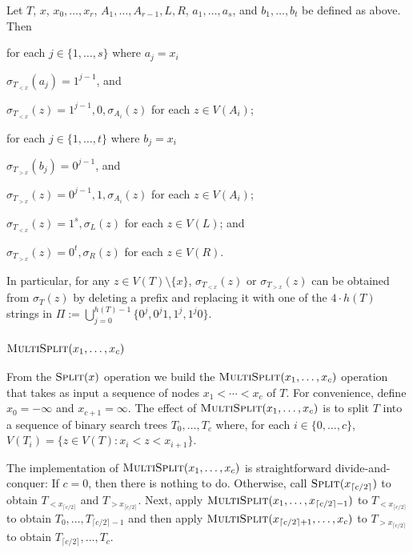 \documentclass[kpfonts]{patmorin}
\begin{document}
\begin{obs}
  Let $T$, $x$, $x_0,\ldots,x_r$, $A_1,\ldots,A_{r-1},L,R$, $a_1,\ldots,a_s$, and $b_1,\ldots,b_t$ be defined as above. Then
  \begin{compactenum}
    \item for each $j\in\{1,\ldots,s\}$ where $a_j=x_i$
    \begin{compactenum}
      \item $\sigma_{T_{<x}}(a_j)=1^{j-1}$, and 
      \item $\sigma_{T_{<x}}(z) = 1^{j-1},0,\sigma_{A_i}(z)$ for each $z\in V(A_i)$;
    \end{compactenum}
    \item for each $j\in\{1,\ldots,t\}$ where $b_j=x_i$
    \begin{compactenum}
      \item $\sigma_{T_{>x}}(b_j)=0^{j-1}$, and 
      \item $\sigma_{T_{>x}}(z) = 0^{j-1},1,\sigma_{A_i}(z)$ for each $z\in V(A_i)$;
    \end{compactenum}
    \item $\sigma_{T_{<x}}(z)=1^s,\sigma_L(z)$ for each $z\in V(L)$; and
    \item $\sigma_{T_{>x}}(z)=0^t,\sigma_R(z)$ for each $z\in V(R)$.
  \end{compactenum}
  In particular, for any $z\in V(T)\setminus\{x\}$, $\sigma_{T_{<x}}(z)$ or $\sigma_{T_{>x}}(z)$ can be obtained from $\sigma_T(z)$ by deleting a prefix and replacing it with one of the $4\cdot h(T)$ strings in $\Pi:=\bigcup_{j=0}^{h(T)-1}\{0^j,0^j1,1^j,1^j0\}$.
\end{obs}

\subsubsection{$\textsc{MultiSplit}(x_1,\ldots,x_c)$}

From the $\textsc{Split}(x)$ operation we build the $\textsc{MultiSplit}(x_1,\ldots,x_c)$ operation that takes as input a sequence of nodes $x_1<\cdots<x_c$ of $T$.  For convenience, define $x_0=-\infty$ and $x_{c+1}=\infty$.  The effect of $\textsc{MultiSplit}(x_1,\ldots,x_c)$ is to split $T$ into a sequence of binary search trees $T_0,\ldots,T_{c}$ where, for each $i\in\{0,\ldots,c\}$, $V(T_i)=\{z\in V(T): x_i< z<x_{i+1}\}$.

The implementation of $\textsc{MultiSplit}(x_1,\ldots,x_c)$ is straightforward divide-and-conquer:  If $c=0$, then there is nothing to do.  Otherwise, call $\textsc{Split}(x_{\lceil c/2\rceil})$ to obtain $T_{<x_{\lceil c/2\rceil}}$ and $T_{>x_{\lceil c/2\rceil}}$.  Next, apply $\textsc{MultiSplit}(x_1,\ldots,x_{\lceil c/2\rceil-1})$ to $T_{<x_{\lceil c/2\rceil}}$ to obtain $T_0,\ldots,T_{\lceil c/2\rceil-1}$ and then apply $\textsc{MultiSplit}(x_{\lceil c/2\rceil+1},\ldots,x_c)$ to $T_{>x_{\lceil c/2\rceil}}$ to obtain $T_{\lceil c/2\rceil},\ldots,T_c$.
\end{document}
